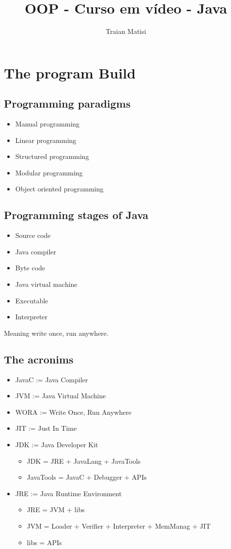 \documentclass[a4paper, 12pt]{article}
\title{OOP - Curso em vídeo - Java}
\author{Traian Matisi}
\begin{document}
	\maketitle
	\section{The program Build}
	\subsection{Programming paradigms}
	\begin{itemize}
		\item Manual programming
		\item Linear programming
		\item Structured programming
		\item Modular programming
		\item Object oriented programming
	\end{itemize}
	\subsection{Programming stages of Java}
	\begin{itemize}
		\item Source code
		\item Java compiler
		\item Byte code
		\item Java virtual machine
		\item Executable
		\item Interpreter
	\end{itemize}
	Meaning write once, run anywhere.
	\subsection{The acronims}
	\begin{itemize}
		\item JavaC := Java Compiler
		\item JVM := Java Virtual Machine
		\item WORA := Write Once, Run Anywhere
		\item JIT := Just In Time
		\item JDK := Java Developer Kit
			\begin{itemize}
				\item JDK = JRE + JavaLang + JavaTools
				\item JavaTools = JavaC + Debugger + APIs
			\end{itemize}
		\item JRE := Java Runtime Environment
			\begin{itemize}
				\item JRE = JVM + libs
				\item JVM = Loader + Verifier + Interpreter + MemManag + JIT
				\item libs = APIs
			\end{itemize}
	\end{itemize}
\end{document}
